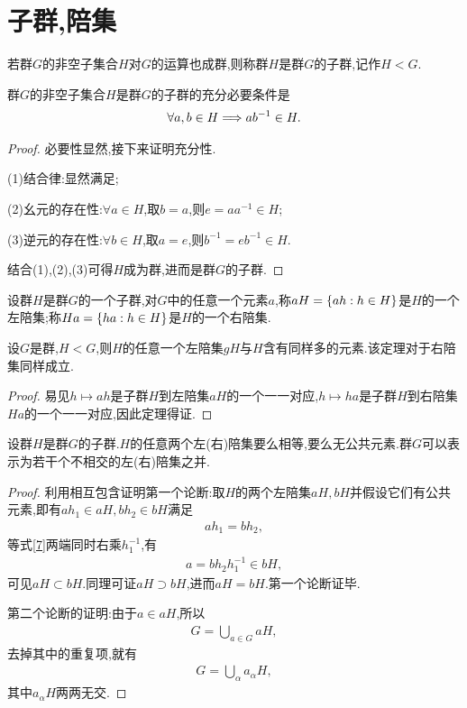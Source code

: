 \section{子群,陪集}
\begin{definition}[子群]
    若群$G$的非空子集合$H$对$G$的运算也成群,则称群$H$是群$G$的子群,记作$H<G$.
\end{definition}
\begin{theorem}\label{p31dl1}
    群$G$的非空子集合$H$是群$G$的子群的充分必要条件是\begin{align*}
        \forall a,b\in H\Longrightarrow ab^{-1}\in H.
    \end{align*}
\end{theorem}
\begin{proof}
    必要性显然,接下来证明充分性.

    (1)结合律:显然满足;

    (2)幺元的存在性:$\forall a\in H$,取$b=a$,则$e=aa^{-1}\in H$;

    (3)逆元的存在性:$\forall b\in H$,取$a=e$,则$b^{-1}=eb^{-1}\in H$.

    结合(1),(2),(3)可得$H$成为群,进而是群$G$的子群.
\end{proof}
\begin{definition}
    设群$H$是群$G$的一个子群,对$G$中的任意一个元素$a$,称$aH=\left\{ah:h\in H\right\}$是$H$的一个左陪集;称$Ha=\left\{ha:h\in H\right\}$是$H$的一个右陪集.
\end{definition}
\begin{theorem}\label{vu1}
    设$G$是群,$H<G$,则$H$的任意一个左陪集$gH$与$H$含有同样多的元素.该定理对于右陪集同样成立.
\end{theorem}
\begin{proof}
    易见$h\mapsto ah$是子群$H$到左陪集$aH$的一个一一对应,$h\mapsto ha$是子群$H$到右陪集$Ha$的一个一一对应,因此定理得证.
\end{proof}
\begin{theorem}\label{p31dy2}
    设群$H$是群$G$的子群.$H$的任意两个左(右)陪集要么相等,要么无公共元素.群$G$可以表示为若干个不相交的左(右)陪集之并.
\end{theorem}
\begin{proof}
    利用相互包含证明第一个论断:取$H$的两个左陪集$aH,bH$并假设它们有公共元素,即有$ah_1\in aH,bh_2\in bH$满足\begin{align}
        ah_1=bh_2,\label{7}
    \end{align}等式\eqref{7}两端同时右乘$h_1^{-1}$,有\begin{align*}
        a=bh_2h_1^{-1}\in bH,
    \end{align*}可见$aH\subset bH$.同理可证$aH\supset bH$,进而$aH=bH$.第一个论断证毕.

    第二个论断的证明:由于$a\in aH$,所以\begin{align*}
        G=\bigcup_{a\in G}aH,
    \end{align*}去掉其中的重复项,就有\begin{align*}
        G=\bigcup_{\alpha}a_{\alpha}H,
    \end{align*}其中$a_{\alpha}H$两两无交.
\end{proof}
